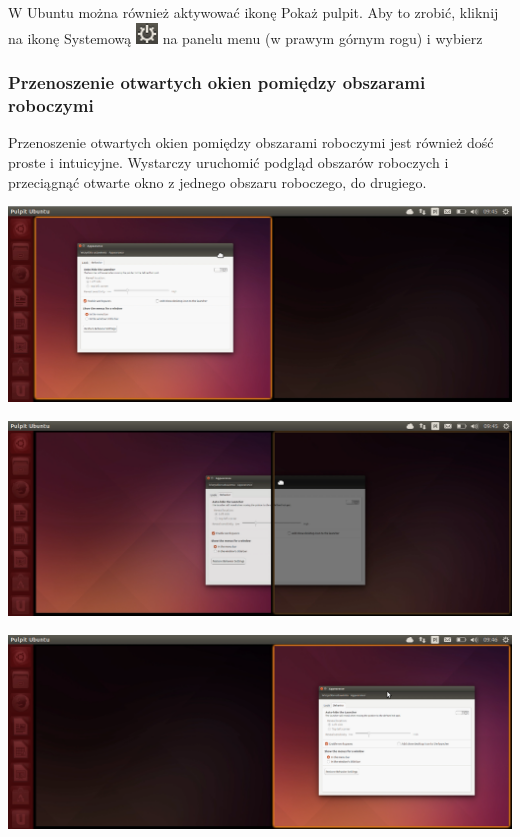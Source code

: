 W Ubuntu można również aktywować ikonę \textcolor{ubuntu_orange}{Pokaż pulpit}. Aby to zrobić, kliknij na ikonę Systemową \includegraphics{images/ikony_zasilanie.png} na panelu menu (w prawym górnym rogu) i wybierz 

\subsubsection{Przenoszenie otwartych okien pomiędzy obszarami roboczymi}
Przenoszenie otwartych okien pomiędzy obszarami roboczymi jest również dość proste i intuicyjne. Wystarczy uruchomić podgląd obszarów roboczych i przeciągnąć otwarte okno z jednego obszaru roboczego, do drugiego.

\begin{center}
	\includegraphics[width=\linewidth]{images/unity_okno_przenoszenie1.png}
\end{center}

\begin{center}
	\includegraphics[width=\linewidth]{images/unity_okno_przenoszenie2.png}
\end{center}

\begin{center}
	\includegraphics[width=\linewidth]{images/unity_okno_przenoszenie3.png}
\end{center}

